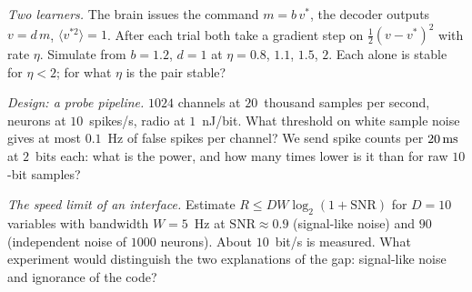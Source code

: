 \begin{exercise}[\lvlB]
\label{ex:17:5}
\emph{Two learners.} The brain issues the command $m=b\,v^*$, the decoder outputs $v=d\,m$, $\langle v^{*2}\rangle=1$. After each trial both take a gradient step on $\tfrac12(v-v^*)^2$ with rate $\eta$. Simulate from $b=1.2$, $d=1$ at $\eta=0.8$, $1.1$, $1.5$, $2$. Each alone is stable for $\eta<2$; for what $\eta$ is the pair stable?
\end{exercise}

\begin{exercise}[\lvlB]
\label{ex:17:6}
\emph{Design: a probe pipeline.} $1024$ channels at $20$~thousand samples per second, neurons at $10$~spikes/s, radio at $1$~nJ/bit. What threshold on white sample noise gives at most $0.1$~Hz of false spikes per channel? We send spike counts per $20\,\text{ms}$ at $2$~bits each: what is the power, and how many times lower is it than for raw $10$-bit samples?
\end{exercise}

\begin{exercise}[\lvlC]
\label{ex:17:7}
\emph{The speed limit of an interface.} Estimate $R\le DW\log_2(1+\text{SNR})$ for $D=10$ variables with bandwidth $W=5$~Hz at $\text{SNR}\approx0.9$ (signal-like noise) and $90$ (independent noise of $1000$ neurons). About $10$~bit/s is measured. What experiment would distinguish the two explanations of the gap: signal-like noise and ignorance of the code?
\end{exercise}
